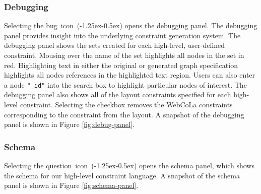 \subsubsection{Debugging}
\debuggingPanel
Selecting the \mbox{bug icon (\kern-1.25ex\kern-0.5ex)} opens the debugging panel. The debugging panel provides insight into the underlying constraint generation system. The debugging panel shows the sets created for each high-level, user-defined constraint. Mousing over the name of the set highlights all nodes in the set in red. Highlighting text in either the original or generated graph specification highlights all nodes references in the highlighted text region. Users can also enter a node \texttt{"\_id"} into the search box to highlight particular nodes of interest. The debugging panel also shows all of the layout constraints specified for each high-level constraint. Selecting the checkbox removes the WebCoLa constraints corresponding to the constraint from the layout. A snapshot of the debugging panel is shown in Figure \ref{fig:debug-panel}.

\subsubsection{Schema}
\schemaPanel
Selecting the \mbox{question icon (\kern-1.25ex\kern-0.5ex)} opens the schema panel, which shows the schema for our high-level constraint language. A snapshot of the schema panel is shown in Figure \ref{fig:schema-panel}.